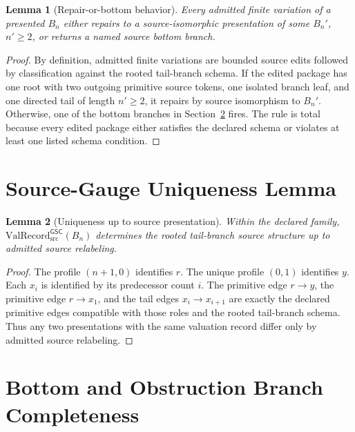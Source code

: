 \documentclass[11pt]{article}
\newcommand{\ValRecord}{\mathrm{ValRecord}_{\mathrm{src}}^{\mathsf{GSC}}}
\newcommand{\Bn}{B_n}
\newtheorem{lemma}{Lemma}
\begin{document}
\begin{lemma}[Repair-or-bottom behavior]
Every admitted finite variation of a presented \(\Bn\) either repairs to a
source-isomorphic presentation of some \(\Bn'\), \(n'\ge 2\), or returns a
named source bottom branch.
\end{lemma}

\begin{proof}
By definition, admitted finite variations are bounded source edits followed by
classification against the rooted tail-branch schema. If the edited package has
one root with two outgoing primitive source tokens, one isolated branch leaf,
and one directed tail of length \(n'\ge 2\), it repairs by source isomorphism to
\(\Bn'\). Otherwise, one of the bottom branches in
Section~\ref{bottom-and-obstruction-branch-completeness} fires. The rule is
total because every edited package either satisfies the declared schema or
violates at least one listed schema condition.
\end{proof}

\section{Source-Gauge Uniqueness Lemma}
\label{source-gauge-uniqueness-lemma}

\begin{lemma}[Uniqueness up to source presentation]
Within the declared family, \(\ValRecord(\Bn)\) determines the rooted
tail-branch source structure up to admitted source relabeling.
\end{lemma}

\begin{proof}
The profile \((n+1,0)\) identifies \(r\). The unique profile \((0,1)\)
identifies \(y\). Each \(x_i\) is identified by its predecessor count \(i\).
The primitive edge \(r\to y\), the primitive edge \(r\to x_1\), and the tail
edges \(x_i\to x_{i+1}\) are exactly the declared primitive edges compatible
with those roles and the rooted tail-branch schema. Thus any two presentations
with the same valuation record differ only by admitted source relabeling.
\end{proof}

\section{Bottom and Obstruction Branch Completeness}
\label{bottom-and-obstruction-branch-completeness}
\end{document}
